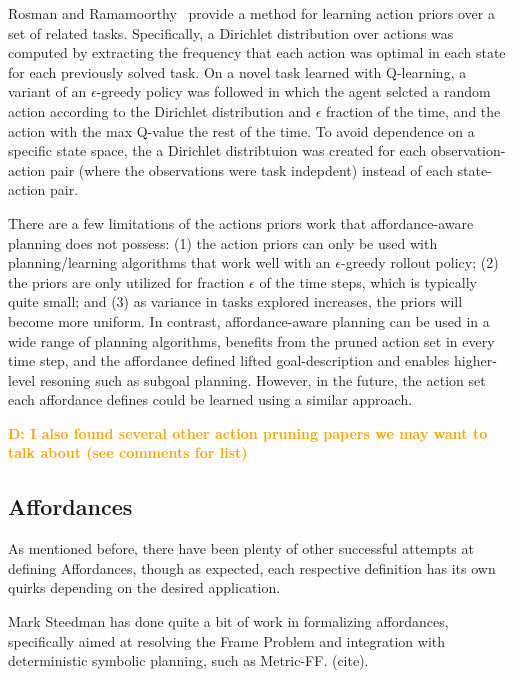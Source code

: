 \documentclass[]{article}
\newcommand{\dnote}[1]{\textcolor{Orange}{\textbf{D: #1}}}
\begin{document}
Rosman and Ramamoorthy~\cite{rosman2012good} provide a method for learning action priors over a set of related tasks. Specifically, a Dirichlet distribution over actions was computed by extracting the frequency that each action was optimal in each state for each previously solved task. On a novel task learned with Q-learning, a variant of an $\epsilon$-greedy policy was followed in which the agent selcted a random action according to the Dirichlet distribution and $\epsilon$ fraction of the time, and the action with the max Q-value the rest of the time. To avoid dependence on a specific state space, the a Dirichlet distribtuion was created for each observation-action pair (where the observations were task indepdent) instead of each state-action pair.

There are a few limitations of the actions priors work that affordance-aware planning does not possess: (1) the action priors can only be used with planning/learning algorithms that work well with an $\epsilon$-greedy rollout policy; (2) the priors are only utilized for fraction $\epsilon$ of the time steps, which is typically quite small; and (3) as variance in tasks explored increases, the priors will become more uniform. In contrast, affordance-aware planning can be used in a wide range of planning algorithms, benefits from the pruned action set in every time step, and the affordance defined lifted goal-description and enables higher-level resoning such as subgoal planning. However, in the future, the action set each affordance defines could be learned using a similar approach.

\dnote{I also found several other action pruning papers we may want to talk about (see comments for list)}


\subsection{Affordances}
As mentioned before, there have been plenty of other successful attempts at defining Affordances, though as expected, each respective definition
has its own quirks depending on the desired application.

Mark Steedman has done quite a bit of work in formalizing affordances, specifically aimed at resolving the Frame Problem and integration with deterministic symbolic planning, such as Metric-FF. (cite).
\end{document}
